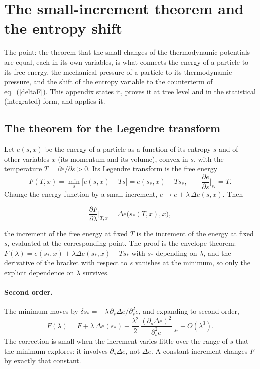 \documentclass[11pt,aps,preprint,nofootinbib,superscriptaddress,tightenlines]{revtex4-2}
\def\st{\begin{equation}}
\def\stp{\end{equation}}
\def\Eq#1{eq.~(\ref{#1})}
\let\oldparagraph\paragraph
\renewcommand{\paragraph}{\par\bigskip\oldparagraph}
\begin{document}
\section{The small-increment theorem and the entropy shift}
\label{app:smallinc}

The point: the theorem that the small changes of the thermodynamic potentials are equal, each in its own variables, is what connects the energy of a particle
to its free energy, the mechanical pressure of a particle to its thermodynamic pressure, and the shift of the entropy variable to the counterterm of
\Eq{deltaF}.  This appendix states it, proves it at tree level and in the statistical (integrated) form, and applies it.

\subsection{The theorem for the Legendre transform}
\label{app:smallinc_legendre}

Let $e(s,x)$ be the energy of a particle as a function of its entropy $s$ and of other variables $x$ (its momentum and its volume), convex in $s$, with the
temperature $T=\partial e/\partial s>0$.  Its Legendre transform is the free energy
\st
F(T,x)=\min_s\big[e(s,x)-Ts\big]=e(s_*,x)-Ts_*,\qquad \frac{\partial e}{\partial s}\Big|_{s_*}=T .
\stp
Change the energy function by a small increment, $e\to e+\lambda\,\Delta e(s,x)$.  Then
\begin{keyeq}
\st
\frac{\partial F}{\partial\lambda}\Big|_{T,x}=\Delta e\big(s_*(T,x),x\big) ,
\label{smallinc}
\stp
\end{keyeq}
the increment of the free energy at fixed $T$ is the increment of the energy at fixed $s$, evaluated at the corresponding point.  The proof is the envelope theorem:
$F(\lambda)=e(s_*,x)+\lambda\Delta e(s_*,x)-Ts_*$ with $s_*$ depending on $\lambda$, and the derivative of the bracket with respect to $s$ vanishes at the minimum, so only the
explicit dependence on $\lambda$ survives.

\paragraph{Second order.}  The minimum moves by $\delta s_*=-\lambda\,\partial_s\Delta e/\partial_s^2e$, and expanding to second order,
\st
F(\lambda)=F+\lambda\,\Delta e(s_*)-\frac{\lambda^2}2\,\frac{(\partial_s\Delta e)^2}{\partial_s^2e}\Big|_{s_*}+O(\lambda^3) .
\label{smallinc2}
\stp
The correction is small when the increment varies little over the range of $s$ that the minimum explores: it involves $\partial_s\Delta e$, not $\Delta e$.  A
constant increment changes $F$ by exactly that constant.
\end{document}
